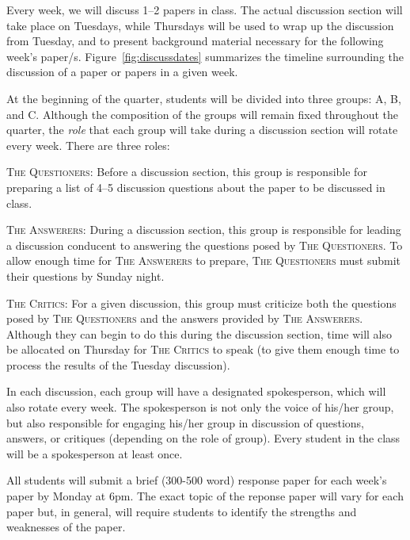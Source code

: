 \documentclass[11pt]{article}
\begin{document}
Every week, we will discuss 1--2 papers in class. The actual discussion section will take place on Tuesdays, while Thursdays will be used to wrap up the discussion from Tuesday, and to present background material necessary for the following week's paper/s. Figure~\ref{fig:discussdates} summarizes the timeline surrounding the discussion of a paper or papers in a given week.

At the beginning of the quarter, students will be divided into three groups: A, B, and C. Although the composition of the groups will remain fixed throughout the quarter, the \emph{role} that each group will take during a discussion section will rotate every week. There are three roles:

\begin{description}
 \item \textsc{The Questioners}: Before a discussion section, this group is responsible for preparing a list of 4--5 discussion questions about the paper to be discussed in class.
 \item \textsc{The Answerers}: During a discussion section, this group is responsible for leading a discussion conducent to answering the questions posed by \textsc{The Questioners}. To allow enough time for \textsc{The Answerers} to prepare, \textsc{The Questioners} must submit their questions by Sunday night.
 \item \textsc{The Critics}: For a given discussion, this group must criticize both the questions posed by \textsc{The Questioners} and the answers provided by \textsc{The Answerers}. Although they can begin to do this during the discussion section, time will also be allocated on Thursday for \textsc{The Critics} to speak (to give them enough time to process the results of the Tuesday discussion).
\end{description}

In each discussion, each group will have a designated spokesperson, which will also rotate every week. The spokesperson is not only the voice of his/her group, but also responsible for engaging his/her group in discussion of questions, answers, or critiques (depending on the role of group). Every student in the class will be a spokesperson at least once.

All students will submit a brief (300-500 word) response paper for each week's paper by Monday at 6pm. The exact topic of the reponse paper will vary for each paper but, in general, will require students to identify the strengths and weaknesses of the paper. 
\end{document}
